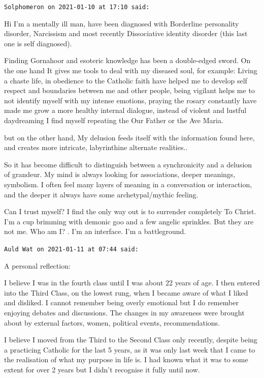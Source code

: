 \begin{footnotesize}\begin{sffamily}



\texttt{Solphomeron on 2021-01-10 at 17:10 said: }

Hi I'm a mentally ill man, have been diagnosed with Borderline personality disorder, Narcissism and most recently Dissociative identity disorder (this last one is self diagnosed).

Finding Gornahoor and esoteric knowledge has been a double-edged sword. On the one hand It gives me tools to deal with my diseased soul, for example: Living a chaste life, in obedience to the Catholic faith have helped me to develop self respect and boundaries between me and other people, being vigilant helps me to not identify myself with my intense emotions, praying the rosary constantly have made me grow a more healthy internal dialogue, instead of violent and lustful daydreaming I find myself repeating the Our Father or the Ave Maria.

but on the other hand, My delusion feeds itself with the information found here, and creates more intricate, labyrinthine alternate realities..

So it has become difficult to distinguish between a synchronicity and a delusion of grandeur. My mind is always looking for associations, deeper meanings, symbolism. I often feel many layers of meaning in a conversation or interaction, and the deeper it always have some archetypal/mythic feeling. 

Can I trust myself? I find the only way out is to surrender completely To Christ. I'm a cup brimming with demonic goo and a few angelic sprinkles. But they are not me. Who am I? . I'm an interface. I'm a battleground.


\hfill

\texttt{Auld Wat on 2021-01-11 at 07:44 said: }

A personal reflection:

I believe I was in the fourth class until I was about 22 years of age. I then entered into the Third Class, on the lowest rung, when I became aware of what I liked and disliked. I cannot remember being overly emotional but I do remember enjoying debates and discussions. The changes in my awareness were brought about by external factors, women, political events, recommendations. 

I believe I moved from the Third to the Second Class only recently, despite being a practicing Catholic for the last 5 years, as it was only last week that I came to the realisation of what my purpose in life is. I had known what it was to some extent for over 2 years but I didn't recognise it fully until now.


\end{sffamily}
\end{footnotesize}
